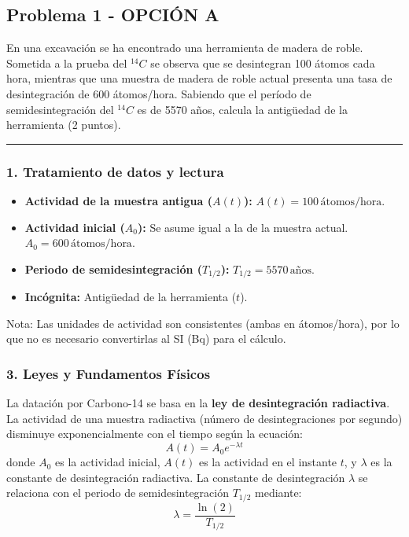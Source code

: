 \subsection{Problema 1 - OPCIÓN A}
\label{subsec:5A_2007_jun_ord}

\begin{cajaenunciado}
En una excavación se ha encontrado una herramienta de madera de roble. Sometida a la prueba del ${}^{14}C$ se observa que se desintegran 100 átomos cada hora, mientras que una muestra de madera de roble actual presenta una tasa de desintegración de 600 átomos/hora. Sabiendo que el período de semidesintegración del ${}^{14}C$ es de 5570 años, calcula la antigüedad de la herramienta (2 puntos).
\end{cajaenunciado}
\hrule

\subsubsection*{1. Tratamiento de datos y lectura}
\begin{itemize}
    \item \textbf{Actividad de la muestra antigua ($A(t)$):} $A(t) = 100\,\text{átomos/hora}$.
    \item \textbf{Actividad inicial ($A_0$):} Se asume igual a la de la muestra actual. $A_0 = 600\,\text{átomos/hora}$.
    \item \textbf{Periodo de semidesintegración ($T_{1/2}$):} $T_{1/2} = 5570\,\text{años}$.
    \item \textbf{Incógnita:} Antigüedad de la herramienta ($t$).
\end{itemize}
Nota: Las unidades de actividad son consistentes (ambas en átomos/hora), por lo que no es necesario convertirlas al SI (Bq) para el cálculo.

\subsubsection*{3. Leyes y Fundamentos Físicos}
La datación por Carbono-14 se basa en la \textbf{ley de desintegración radiactiva}. La actividad de una muestra radiactiva (número de desintegraciones por segundo) disminuye exponencialmente con el tiempo según la ecuación:
$$ A(t) = A_0 e^{-\lambda t} $$
donde $A_0$ es la actividad inicial, $A(t)$ es la actividad en el instante $t$, y $\lambda$ es la constante de desintegración radiactiva.
La constante de desintegración $\lambda$ se relaciona con el periodo de semidesintegración $T_{1/2}$ mediante:
$$ \lambda = \frac{\ln(2)}{T_{1/2}} $$

